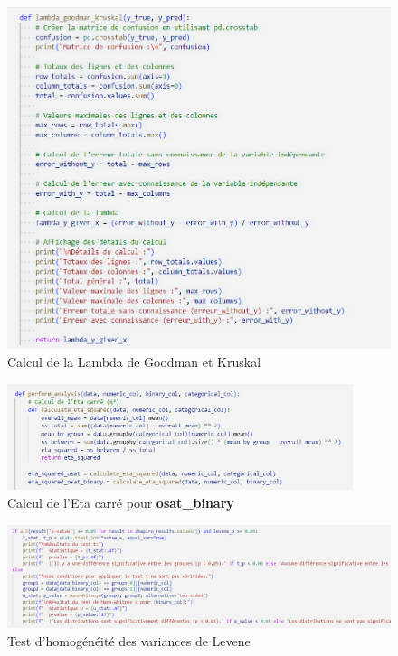 \begin{figure}[H]
    \centering
    \includegraphics[width=\textwidth]{capture_sas_16.png}
    \caption{Calcul de la Lambda de Goodman et Kruskal}
    \label{555}
\end{figure}
\vspace{10pt}

\begin{figure}[H]
    \centering
    \includegraphics[width=0.9\textwidth]{capture_sas_19.png}
    \caption{Calcul de l'Eta carré pour \textbf{osat\_binary}}
    \label{26203}
\end{figure}
\vspace{10pt}

\begin{figure}[H]
    \centering
    \includegraphics[width=0.8\linewidth]{capture_sas_21.png}
    \caption{Test d'homogénéité des variances de Levene}
    \label{168}
\end{figure}
\vspace{10pt}

